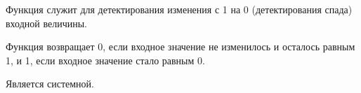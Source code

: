 Функция служит для детектирования изменения с 1 на 0 (детектирования спада) входной величины. \killoverfullbefore

Функция возвращает 0, если входное значение не изменилось и осталось равным 1, и 1, если входное значение стало равным 0. \killoverfullbefore

Является системной.


